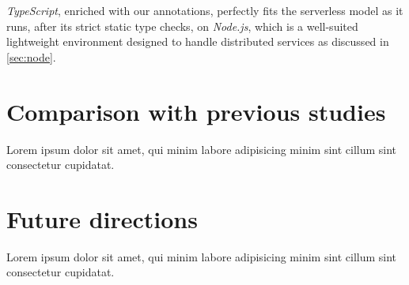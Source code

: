 \textit{TypeScript}, enriched with our annotations, perfectly fits
the serverless model as it runs, after its strict static type checks,
on \textit{Node.js}, which is a well-suited lightweight environment designed to handle distributed services
as discussed in \cref{sec:node}.

\section{Comparison with previous studies}

Lorem ipsum dolor sit amet, qui minim labore adipisicing minim sint cillum sint consectetur cupidatat.

\section{Future directions}

Lorem ipsum dolor sit amet, qui minim labore adipisicing minim sint cillum sint consectetur cupidatat.
